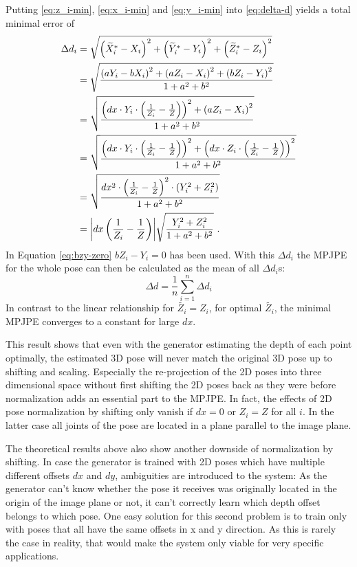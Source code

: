 Putting \eqref{eq:z_i-min}, \eqref{eq:x_i-min} and \eqref{eq:y_i-min} into \eqref{eq:delta-d} yields a total minimal error of 
\begin{align}
	\Delta d_i &= 
	\sqrt{\left (\widetilde{X}_i^\ast - X_i \right )^2 + \left (\widetilde{Y}_i^\ast - Y_i \right )^2 + \left (\widetilde{Z}_i^\ast - Z_i \right )^2}\\
	& = \sqrt{\frac{\left (a Y_i - b X_i \right )^2 + \left (a Z_i - X_i \right )^2 + \left (b Z_i - Y_i \right )^2}{1 + a^2 + b^2}} \\
	\label{eq:bzy-zero}
	&= \sqrt{\frac{\left (dx \cdot Y_i \cdot \left (\frac{1}{Z_i} - \frac{1}{Z} \right) \right)^2 + \left (a Z_i - X_i \right )^2}{1 + a^2 + b^2}}\\
	& = \sqrt{\frac{\left (dx \cdot Y_i \cdot \left (\frac{1}{Z_i} - \frac{1}{Z} \right ) \right)^2 + \left (dx \cdot Z_i \cdot \left (\frac{1}{Z_i} - \frac{1}{Z} \right ) \right)^2}{1 + a^2 + b^2}} \\
	& = \sqrt{\frac{dx^2 \cdot \left (\frac{1}{Z_i} - \frac{1}{Z} \right )^2 \cdot \left (Y_i^2 + Z_i^2 \right ) }{1 + a^2 + b^2}}\\
	\label{eq:minimum-delta-d}
	& = \abs{dx \left (\frac{1}{Z_i} - \frac{1}{Z} \right )} \sqrt{\frac{Y_i^2 + Z_i^2}{1 + a^2 + b^2}} \ .
\end{align}
In Equation \eqref{eq:bzy-zero} $b Z_i - Y_i = 0$ has been used.
With this $\Delta d_i$ the MPJPE for the whole pose can then be calculated as the mean of all $\Delta d_i$s:
\begin{equation}
	\label{eq:minimum-mpjpe-on-shift}
	\Delta d = \frac{1}{n} \sum_{i = 1}^{n} \Delta d_i 
\end{equation}
In contrast to the linear relationship for $\widetilde{Z_i} = Z_i$, for optimal $\widetilde{Z_i}$, the minimal MPJPE converges to a constant for large $dx$.

This result shows that even with the generator estimating the depth of each point optimally, the estimated 3D pose will never match the original 3D pose up to shifting and scaling.
Especially the re-projection of the 2D poses into three dimensional space without first shifting the 2D poses back as they were before normalization adds an essential part to the MPJPE.
In fact, the effects of 2D pose normalization by shifting only vanish if $dx = 0$ or $Z_i = Z$ for all $i$. 
In the latter case all joints of the pose are located in a plane parallel to the image plane.

The theoretical results above also show another downside of normalization by shifting.
In case the generator is trained with 2D poses which have multiple different offsets $dx$ and $dy$, ambiguities are introduced to the system:
As the generator can't know whether the pose it receives was originally located in the origin of the image plane or not, it can't correctly learn which depth offset belongs to which pose.
One easy solution for this second problem is to train only with poses that all have the same offsets in x and y direction.
As this is rarely the case in reality, that would make the system only viable for very specific applications.

